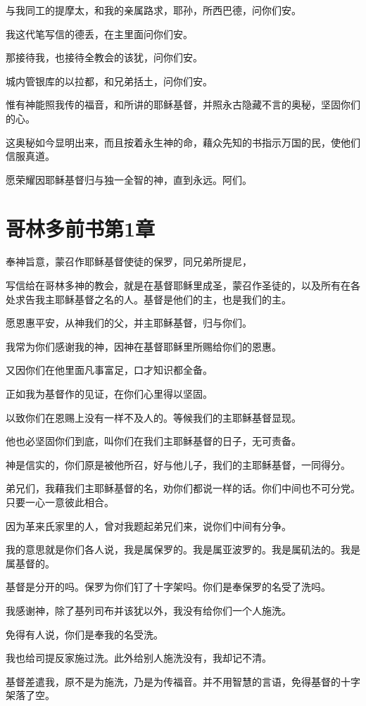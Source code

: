\documentclass[12pt,oneside]{book}
\begin{document}
与我同工的提摩太，和我的亲属路求，耶孙，所西巴德，问你们安。

我这代笔写信的德丢，在主里面问你们安。

那接待我，也接待全教会的该犹，问你们安。

城内管银库的以拉都，和兄弟括土，问你们安。

惟有神能照我传的福音，和所讲的耶稣基督，并照永古隐藏不言的奥秘，坚固你们的心。

这奥秘如今显明出来，而且按着永生神的命，藉众先知的书指示万国的民，使他们信服真道。

愿荣耀因耶稣基督归与独一全智的神，直到永远。阿们。

\chapter{哥林多前书第1章}
奉神旨意，蒙召作耶稣基督使徒的保罗，同兄弟所提尼，

写信给在哥林多神的教会，就是在基督耶稣里成圣，蒙召作圣徒的，以及所有在各处求告我主耶稣基督之名的人。基督是他们的主，也是我们的主。

愿恩惠平安，从神我们的父，并主耶稣基督，归与你们。

我常为你们感谢我的神，因神在基督耶稣里所赐给你们的恩惠。

又因你们在他里面凡事富足，口才知识都全备。

正如我为基督作的见证，在你们心里得以坚固。

以致你们在恩赐上没有一样不及人的。等候我们的主耶稣基督显现。

他也必坚固你们到底，叫你们在我们主耶稣基督的日子，无可责备。

神是信实的，你们原是被他所召，好与他儿子，我们的主耶稣基督，一同得分。

弟兄们，我藉我们主耶稣基督的名，劝你们都说一样的话。你们中间也不可分党。只要一心一意彼此相合。

因为革来氏家里的人，曾对我题起弟兄们来，说你们中间有分争。

我的意思就是你们各人说，我是属保罗的。我是属亚波罗的。我是属矶法的。我是属基督的。

基督是分开的吗。保罗为你们钉了十字架吗。你们是奉保罗的名受了洗吗。

我感谢神，除了基列司布并该犹以外，我没有给你们一个人施洗。

免得有人说，你们是奉我的名受洗。

我也给司提反家施过洗。此外给别人施洗没有，我却记不清。

基督差遣我，原不是为施洗，乃是为传福音。并不用智慧的言语，免得基督的十字架落了空。
\end{document}
